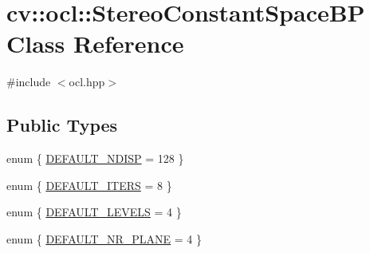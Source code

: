 \hypertarget{classcv_1_1ocl_1_1StereoConstantSpaceBP}{\section{cv\-:\-:ocl\-:\-:Stereo\-Constant\-Space\-B\-P Class Reference}
\label{classcv_1_1ocl_1_1StereoConstantSpaceBP}
}


{\ttfamily \#include $<$ocl.\-hpp$>$}

\subsection*{Public Types}
\begin{DoxyCompactItemize}
\item 
enum \{ \hyperlink{classcv_1_1ocl_1_1StereoConstantSpaceBP_a16c6f9e29f37aa9097b027ca6eae742fa46554bb69bd93acf262b297a839f4df2}{D\-E\-F\-A\-U\-L\-T\-\_\-\-N\-D\-I\-S\-P} = 128
 \}
\item 
enum \{ \hyperlink{classcv_1_1ocl_1_1StereoConstantSpaceBP_ae51cf6598fd9eaffd2c9761d77522d2aab250ddaaa6f7d4bc11eef49db32519de}{D\-E\-F\-A\-U\-L\-T\-\_\-\-I\-T\-E\-R\-S} = 8
 \}
\item 
enum \{ \hyperlink{classcv_1_1ocl_1_1StereoConstantSpaceBP_aaa2123fd6eef898c7f3669680787f755a9192c44f892c21cf9dc15d87854bd1b9}{D\-E\-F\-A\-U\-L\-T\-\_\-\-L\-E\-V\-E\-L\-S} = 4
 \}
\item 
enum \{ \hyperlink{classcv_1_1ocl_1_1StereoConstantSpaceBP_ac7f66a3699ca08037c7066e1852d720ea4f5577aafdee21ffb91979ad2c5f45eb}{D\-E\-F\-A\-U\-L\-T\-\_\-\-N\-R\-\_\-\-P\-L\-A\-N\-E} = 4
 \}
\end{DoxyCompactItemize}
